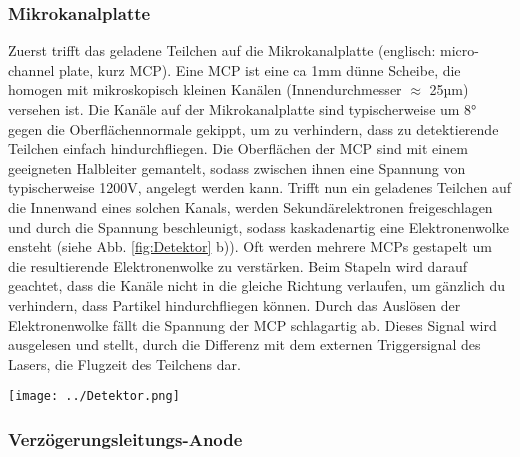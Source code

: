 \subsubsection{Mikrokanalplatte}
Zuerst trifft das geladene Teilchen auf die Mikrokanalplatte (englisch: micro-channel plate, kurz MCP). Eine MCP ist eine ca 1mm dünne Scheibe, die homogen mit mikroskopisch kleinen Kanälen (Innendurchmesser $\approx$ 25µm) versehen ist. Die Kanäle auf der Mikrokanalplatte sind typischerweise um 8° gegen die Oberflächennormale gekippt, um zu verhindern, dass zu detektierende Teilchen einfach hindurchfliegen. Die Oberflächen der MCP sind mit einem geeigneten Halbleiter gemantelt, sodass zwischen ihnen eine Spannung von typischerweise 1200V, angelegt werden kann. Trifft nun ein geladenes Teilchen auf die Innenwand eines solchen Kanals, werden Sekundärelektronen freigeschlagen und durch die Spannung beschleunigt, sodass kaskadenartig eine Elektronenwolke ensteht (siehe Abb. \ref{fig:Detektor} b)). Oft werden mehrere MCPs gestapelt um die resultierende Elektronenwolke zu verstärken. Beim Stapeln wird darauf geachtet, dass die Kanäle nicht in die gleiche Richtung verlaufen, um gänzlich du verhindern, dass Partikel hindurchfliegen können. %
Durch das Auslösen der Elektronenwolke fällt die Spannung der MCP schlagartig ab. Dieses Signal wird ausgelesen und stellt, durch die Differenz mit dem externen Triggersignal des Lasers, die Flugzeit des Teilchens dar. 
\begin{center}
\begin{minipage}{\linewidth}
\centering
\texttt{[image: ../Detektor.png]}%
 \label{fig:Detektor}
\end{minipage} 
\end{center} 


\subsubsection{Verzögerungsleitungs-Anode}

